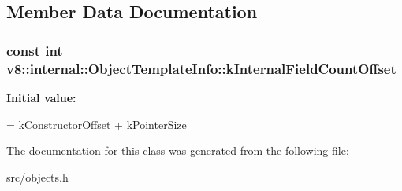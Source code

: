 \subsection{Member Data Documentation}
\hypertarget{classv8_1_1internal_1_1_object_template_info_ad8de4c8ea2787200b80095e8457146ad}{}
\subsubsection[{k\+Internal\+Field\+Count\+Offset}]{\setlength{\rightskip}{0pt plus 5cm}const int v8\+::internal\+::\+Object\+Template\+Info\+::k\+Internal\+Field\+Count\+Offset\hspace{0.3cm}{\ttfamily [static]}}\label{classv8_1_1internal_1_1_object_template_info_ad8de4c8ea2787200b80095e8457146ad}
{\bfseries Initial value\+:}
\begin{DoxyCode}
=
      kConstructorOffset + kPointerSize
\end{DoxyCode}


The documentation for this class was generated from the following file\+:\begin{DoxyCompactItemize}
\item 
src/objects.\+h\end{DoxyCompactItemize}
